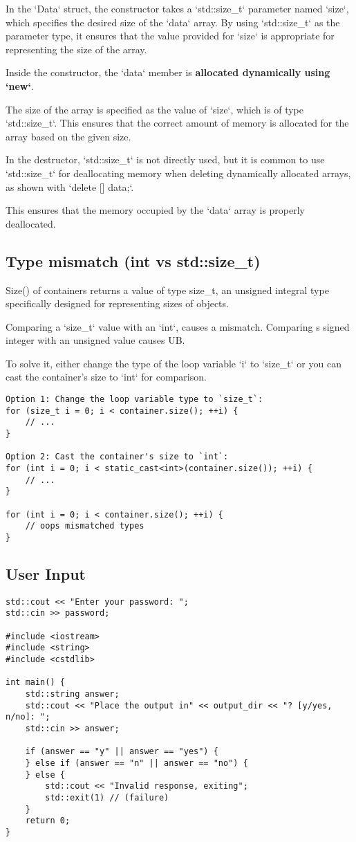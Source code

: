 \documentclass[openany]{report}
\begin{document}
In the `Data` struct, the constructor takes a `std::size\_t` parameter named `size`,
which specifies the desired size of the `data` array. 
By using `std::size\_t` as the parameter type, 
it ensures that the value provided for `size` is appropriate for representing the size of the array.

Inside the constructor, the `data` member is \textbf{allocated dynamically using `new`}.

The size of the array is specified as the value of `size`, which is of type `std::size\_t`. 
This ensures that the correct amount of memory is allocated for the array based on the given size.

In the destructor, `std::size\_t` is not directly used, but it is common to use `std::size\_t`
for deallocating memory when deleting dynamically allocated arrays, as shown with `delete [] data;`.

This ensures that the memory occupied by the `data` array is properly deallocated.

\subsection{Type mismatch (int vs std::size\_t)}

Size() of containers returns a value of type size\_t, 
an unsigned integral type specifically designed for representing sizes of objects.

Comparing a `size\_t` value with an `int`, causes a mismatch.
Comparing s signed integer with an unsigned value causes UB.

To solve it, either change the type of the loop variable `i` to `size\_t`
or you can cast the container's size to `int` for comparison.

\begin{verbatim}
Option 1: Change the loop variable type to `size_t`:
for (size_t i = 0; i < container.size(); ++i) {
    // ...
}

Option 2: Cast the container's size to `int`:
for (int i = 0; i < static_cast<int>(container.size()); ++i) {
    // ...
}

for (int i = 0; i < container.size(); ++i) {
    // oops mismatched types
}
\end{verbatim}


\subsection{User Input}

\begin{verbatim}
std::cout << "Enter your password: ";
std::cin >> password;

#include <iostream>
#include <string>
#include <cstdlib>

int main() {
    std::string answer;
    std::cout << "Place the output in" << output_dir << "? [y/yes, n/no]: ";
    std::cin >> answer;

    if (answer == "y" || answer == "yes") {
    } else if (answer == "n" || answer == "no") {
    } else {
        std::cout << "Invalid response, exiting";
        std::exit(1) // (failure)
    }
    return 0;
}
\end{verbatim}
\end{document}
